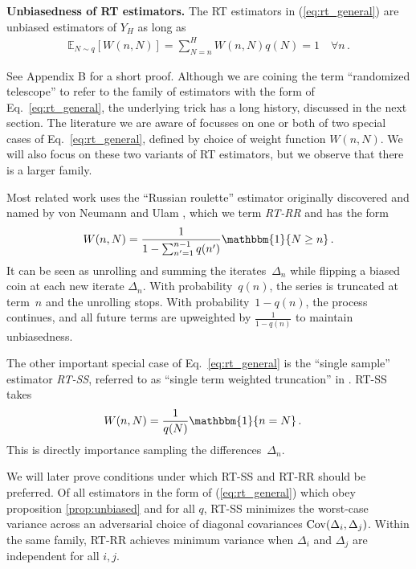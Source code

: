 \begin{proposition}\label{prop:unbiased}
\textbf{Unbiasedness of RT estimators.}
The RT estimators in (\ref{eq:rt_general}) are unbiased estimators of
$Y_H$ as long as
\begin{align}
\mathbb{E}_{N\sim q} [W(n, N)] = \sum_{N=n}^H W(n, N)q(N) = 1 \quad \forall n\,.
\end{align}
\end{proposition}
%
See Appendix B for a short proof.
Although we are coining the term ``randomized telescope'' to refer to the family of estimators with the form of Eq.~\ref{eq:rt_general}, the underlying trick has a long history, discussed in the next section.
The literature we are aware of focusses on one or both of two special cases of Eq.~\ref{eq:rt_general}, defined by choice of weight function $W(n, N)$.
We will also focus on these two variants of RT estimators, but we observe that there is a larger family.

Most related work uses the ``Russian roulette'' estimator originally discovered and named by von Neumann and Ulam \cite{kahn1955use}, which we term \emph{RT-RR} and has the form
\begin{align}
W(n, N) = \frac{1}{1 - \sum_{n'=1}^{n-1}q(n')} \mathbbm{1}\{N \geq n\}\,.
\end{align}
It can be seen as unrolling and summing the iterates~$\Delta_n$ while flipping a biased coin at each new iterate $\Delta_n$.
With probability~$q(n)$, the series is truncated at term~$n$ and the unrolling stops.
With probability~${1 - q(n)}$, the process continues, and all future terms are upweighted by $\frac{1}{1-q(n)}$ to maintain unbiasedness.

The other important special case of Eq.~\ref{eq:rt_general} is the ``single sample'' estimator \emph{RT-SS}, referred to as ``single term weighted truncation'' in \citet{lyne2015russian}.
RT-SS takes
\begin{align}
W(n, N) &= \frac{1}{q(N)} \mathbbm{1} \{n = N\}\,.
\end{align}
This is directly importance sampling the differences~$\Delta_n$.

We will later prove conditions under which RT-SS and RT-RR should be preferred.
Of all estimators in the form of (\ref{eq:rt_general}) which obey proposition \ref{prop:unbiased} and for all $q$, RT-SS minimizes the worst-case variance across an adversarial choice of diagonal covariances $\mathrm{Cov}(\Delta_i, \Delta_j)$.
Within the same family, RT-RR achieves minimum variance when $\Delta_i$ and $\Delta_j$ are independent for all $i, j$.

